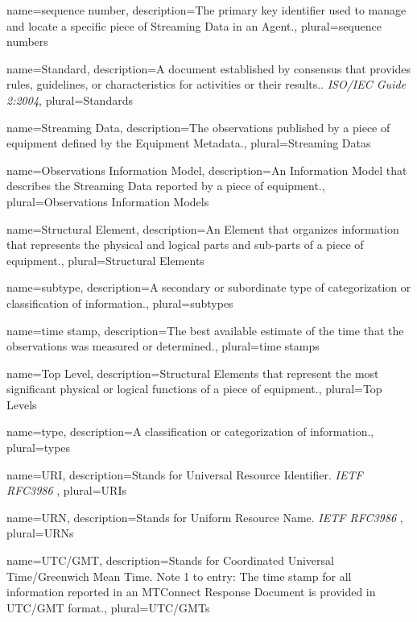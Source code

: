 {
    name={sequence number},
	description={The primary key identifier used to manage and locate a specific piece of \gls{Streaming Data} in an \gls{Agent}.},
	plural={sequence numbers}
}

{
    name={Standard},
	description={A document established by consensus that provides rules, guidelines, or characteristics for activities or their results.. \textit{ISO/IEC Guide 2:2004}},
	plural={Standards}
}

{
    name={Streaming Data},
	description={The \glspl{observation} published by a piece of equipment defined by the \gls{Equipment Metadata}.},
	plural={Streaming Datas}
}

{
    name={Observations Information Model},
	description={An \gls{Information Model} that describes the \gls{Streaming Data} reported by a piece of equipment.},
	plural={Observations Information Models}
}

{
    name={Structural Element},
	description={An \gls{Element} that organizes information that represents the physical and logical parts and sub-parts of a piece of equipment.},
	plural={Structural Elements}
}

{
    name={subtype},
	description={A secondary or subordinate type of categorization or classification of information.},
	plural={subtypes}
}

{
    name={time stamp},
	description={The best available estimate of the time that the \glspl{observation} was measured or determined.},
	plural={time stamps}
}

{
    name={Top Level},
	description={\glspl{Structural Element} that represent the most significant physical or logical functions of a piece of equipment.},
	plural={Top Levels}
}

{
    name={type},
	description={A classification or categorization of information.},
	plural={types}
}

{
    name={URI},
	description={Stands for Universal Resource Identifier. \textit{IETF RFC3986}
},
	plural={URIs}
}

{
    name={URN},
	description={Stands for Uniform Resource Name. \textit{IETF RFC3986}
},
	plural={URNs}
}

{
    name={UTC/GMT},
	description={Stands for Coordinated Universal Time/Greenwich Mean Time.  
Note 1 to entry: The \gls{time stamp} for all information reported in an \gls{MTConnect Response Document} is provided in UTC/GMT format.},
	plural={UTC/GMTs}
}

